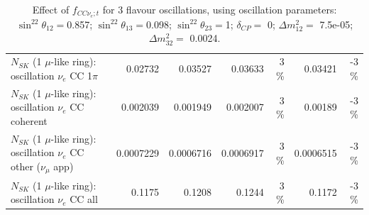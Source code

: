 \begin{table}
\begin{tabular}{| l | r | r | r  r | r  r |}
                     $N_{SK}$ (1 $\mu$-like ring): oscillation $\nu_e$ CC 1$\pi$ &         0.02732 &         0.03527 &         0.03633 &        3 \%  &         0.03421 &       -3 \%  \\ 
                   $N_{SK}$ (1 $\mu$-like ring): oscillation $\nu_e$ CC coherent &        0.002039 &        0.001949 &        0.002007 &        3 \%  &         0.00189 &       -3 \%  \\ 
      $N_{SK}$ (1 $\mu$-like ring): oscillation $\nu_e$ CC other ($\nu_\mu$ app) &       0.0007229 &       0.0006716 &       0.0006917 &        3 \%  &       0.0006515 &       -3 \%  \\ 
                       $N_{SK}$ (1 $\mu$-like ring): oscillation $\nu_e$  CC all &          0.1175 &          0.1208 &          0.1244 &        3 \%  &          0.1172 &       -3 \%  \\ 
\hline
\hline
\end{tabular}
\caption{ Effect of $f_{CC\nu_e; t}$ for 3 flavour oscillations, using oscillation parameters:  $\sin^22\theta_{12} = $0.857; $\sin^22\theta_{13} = $0.098; $\sin^22\theta_{23} = $1; $\delta_{CP} = $        0; $\Delta m^2_{12} = $    7.5e-05; $\Delta m^2_{32} = $    0.0024. }
\label{tab:num_xsec_norm_nuetonumu_1RmuT_3f_osc_t13:0.098}
\end{table}
\clearpage
